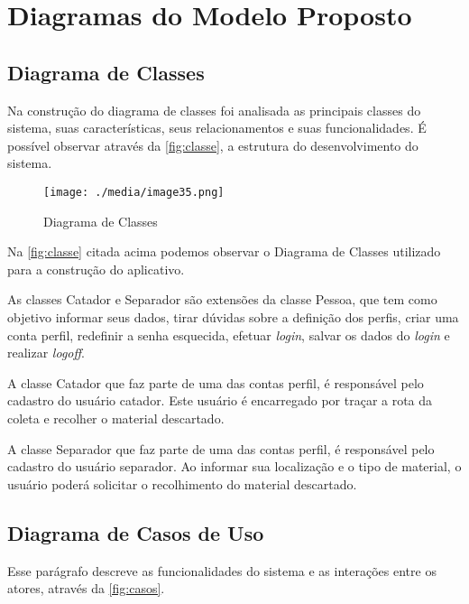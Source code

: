 \section{Diagramas do Modelo Proposto}

\subsection{Diagrama de Classes}

Na construção do diagrama de classes foi analisada as principais classes do sistema, suas características, seus relacionamentos e suas funcionalidades. É possível observar através da \autoref{fig:classe}, a estrutura do desenvolvimento do sistema.


\begin{figure}[H]
	\begin{Center}
		\texttt{[image: ./media/image35.png]}
	\end{Center}
	\caption{Diagrama de Classes}
	\label{fig:classe}
\end{figure}


Na \autoref{fig:classe} citada acima podemos observar o Diagrama de Classes utilizado para a construção do aplicativo.

As classes Catador e Separador são extensões da classe Pessoa, que tem como objetivo informar seus dados, tirar dúvidas sobre a definição dos perfis, criar uma conta perfil, redefinir a senha esquecida, efetuar \textit{login}, salvar os dados do \textit{login} e realizar \textit{logoff}.

A classe Catador que faz parte de uma das contas perfil, é responsável pelo cadastro do usuário catador. Este usuário é encarregado por traçar a rota da coleta e recolher o material descartado.

A classe Separador que faz parte de uma das contas perfil, é responsável pelo cadastro do usuário separador. Ao informar sua localização e o tipo de material, o usuário poderá solicitar o recolhimento do material descartado.

\subsection{Diagrama de Casos de Uso}

Esse parágrafo descreve as funcionalidades do sistema e as interações entre os atores, através da \autoref{fig:casos}. 

